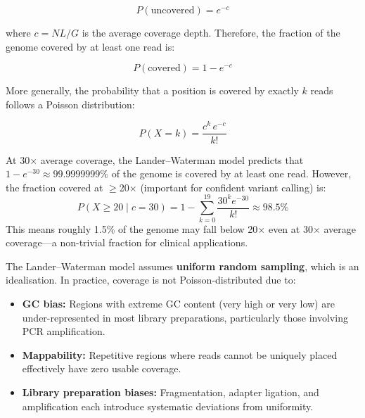 \begin{equation}
P(\text{uncovered}) = e^{-c}
\label{eq:seqprinciples:lander-waterman}
\end{equation}

where $c = NL/G$ is the average coverage depth. Therefore, the fraction of the genome covered by at least one read is:

\begin{equation}
P(\text{covered}) = 1 - e^{-c}
\label{eq:seqprinciples:genome-coverage}
\end{equation}

More generally, the probability that a position is covered by exactly $k$ reads follows a Poisson distribution:

\begin{equation}
P(X = k) = \frac{c^k \, e^{-c}}{k!}
\label{eq:seqprinciples:poisson-coverage}
\end{equation}

\begin{keyconcept}[title={Coverage Thresholds from the Lander--Waterman Model}]
At 30$\times$ average coverage, the Lander--Waterman model predicts that $1 - e^{-30} \approx 99.9999999\%$ of the genome is covered by at least one read. However, the fraction covered at $\geq$20$\times$ (important for confident variant calling) is:
\[
P(X \geq 20 \mid c=30) = 1 - \sum_{k=0}^{19} \frac{30^k e^{-30}}{k!} \approx 98.5\%
\]
This means roughly 1.5\% of the genome may fall below 20$\times$ even at 30$\times$ average coverage---a non-trivial fraction for clinical applications.
\end{keyconcept}

The Lander--Waterman model assumes \textbf{uniform random sampling}, which is an idealisation. In practice, coverage is not Poisson-distributed due to:

\begin{itemize}[itemsep=2pt]
  \item \textbf{GC bias:} Regions with extreme GC content (very high or very low) are under-represented in most library preparations, particularly those involving \acrshort{PCR} amplification.
  \item \textbf{Mappability:} Repetitive regions where reads cannot be uniquely placed effectively have zero usable coverage.
  \item \textbf{Library preparation biases:} Fragmentation, adapter ligation, and amplification each introduce systematic deviations from uniformity.
\end{itemize}


